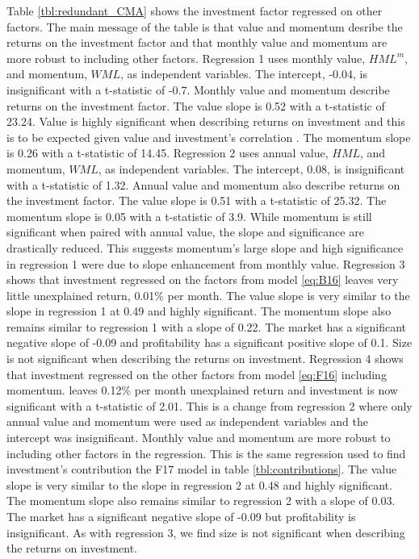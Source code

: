 
Table \ref{tbl:redundant_CMA} shows the investment factor regressed on other
factors.
The main message of the table is that value and momentum desribe the returns on
the investment factor and that monthly value and momentum are more robust to
including other factors.
Regression 1 uses monthly value, $HML^m$, and momentum, $WML$, as independent
variables.
The intercept, -0.04, is insignificant with a t-statistic of -0.7.
Monthly value and momentum describe returns on the investment factor.
The value slope is 0.52 with a t-statistic of 23.24.
Value is highly significant when describing returns on investment and this is
to be expected given value and investment's correlation
\parencite{fama2015five}.
The momentum slope is 0.26 with a t-statistic of 14.45.
Regression 2 uses annual value, $HML$, and momentum, $WML$, as independent
variables.
The intercept, 0.08, is insignificant with a t-statistic of 1.32.
Annual value and momentum also describe returns on the investment factor.
The value slope is 0.51 with a t-statistic of 25.32.
The momentum slope is 0.05 with a t-statistic of 3.9.
While momentum is still significant when paired with annual value,
the slope and significance are drastically reduced.
This suggests momentum's large slope and high
significance
in regression 1 were due to slope enhancement from monthly value.
Regression 3 shows that investment regressed on the factors from
model \ref{eq:B16}
leaves very little unexplained return, 0.01\% per month.
The value slope is very similar to the slope in regression 1 at 0.49 and highly
significant.
The momentum slope also remains similar to regression 1 with a slope of 0.22.
The market has a significant negative slope of -0.09 and
profitability has a significant positive slope of 0.1.
Size is not significant when describing the returns on investment.
Regression 4 shows that investment regressed on the other factors from
model \ref{eq:F16} including momentum.
leaves 0.12\% per month unexplained return
and investment is now significant with a t-statistic of 2.01.
This is a change from regression 2 where only annual value and momentum were
used as independent variables and the intercept was insignificant.
Monthly value and momentum are more robust to including other factors in the
regression.
This is the same regression used to find investment's contribution the F17
model in table \ref{tbl:contributions}.
The value slope is very similar to the slope in regression 2 at 0.48 and highly
significant.
The momentum slope also remains similar to regression 2 with a slope of 0.03.
The market has a significant negative slope of -0.09 but
profitability is insignificant.
As with regression 3, we find size is not significant when describing the
returns on investment.

